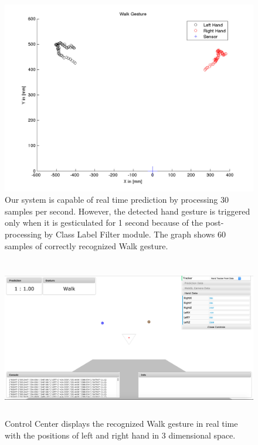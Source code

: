 \begin{figure}
	[h] \hspace{-15 mm} \centering 
	\includegraphics[width=155mm]{figures/result/test-walk.jpg} \caption{ Our system is capable of real time prediction by processing 30 samples per second. However, the detected hand gesture is triggered only when it is gesticulated for 1 second because of the post-processing by Class Label Filter module. The graph shows 60 samples of correctly recognized Walk gesture. } \label{res:pl:walk} 
\end{figure}
\begin{figure}
	[h] \centering 
	\includegraphics[height=70mm]{figures/result/cc-walk.jpg} \caption{Control Center displays the recognized Walk gesture in real time with the positions of left and right hand in 3 dimensional space.} \label{res:cc:walk} 
\end{figure}
